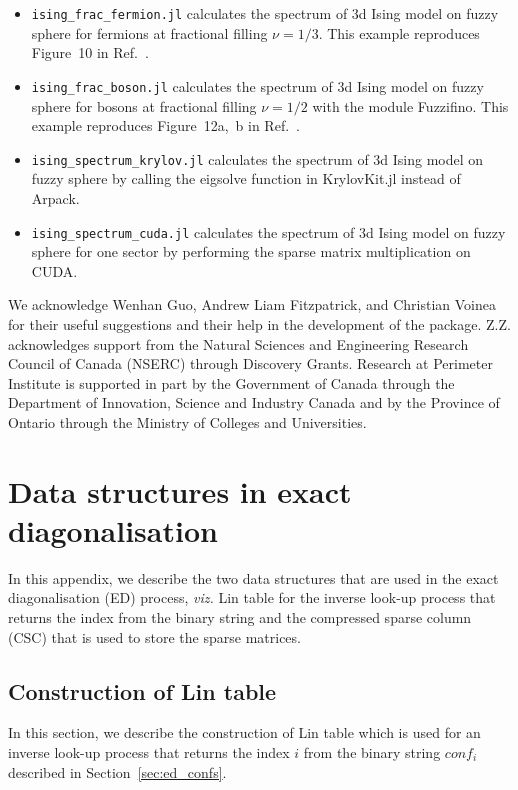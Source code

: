 \documentclass{timesjhep}
\begin{document}
\begin{itemize}
    \item \lstinline|ising_frac_fermion.jl| calculates the spectrum of 3d Ising model on fuzzy sphere for fermions at fractional filling $\nu = 1/3$. This example reproduces Figure~10 in Ref.~\cite{Voinea2024}.
    \item \lstinline|ising_frac_boson.jl| calculates the spectrum of 3d Ising model on fuzzy sphere for bosons at fractional filling $\nu = 1/2$ with the module Fuzzifino. This example reproduces Figure~12a,~b in Ref.~\cite{Voinea2024}.
    \item \lstinline|ising_spectrum_krylov.jl| calculates the spectrum of 3d Ising model on fuzzy sphere by calling the eigsolve function in KrylovKit.jl instead of Arpack.
    \item \lstinline|ising_spectrum_cuda.jl| calculates the spectrum of 3d Ising model on fuzzy sphere for one sector by performing the sparse matrix multiplication on CUDA.
\end{itemize}

\acknowledgments

We acknowledge Wenhan Guo, Andrew Liam Fitzpatrick, and Christian Voinea for their useful suggestions and their help in the development of the package. Z.Z. acknowledges support from the Natural Sciences and Engineering Research Council of Canada (NSERC) through Discovery Grants. Research at Perimeter Institute is supported in part by the Government of Canada through the Department of Innovation, Science and Industry Canada and by the Province of Ontario through the Ministry of Colleges and Universities.

\appendix

\section{Data structures in exact diagonalisation}

In this appendix, we describe the two data structures that are used in the exact diagonalisation (ED) process, \textit{viz.} Lin table for the inverse look-up process that returns the index from the binary string and the compressed sparse column (CSC) that is used to store the sparse matrices. 

\subsection{Construction of Lin table}
\label{app:data_lin}

In this section, we describe the construction of Lin table which is used for an inverse look-up process that returns the index $i$ from the binary string $conf_i$ described in Section~\ref{sec:ed_confs}. 
\end{document}
